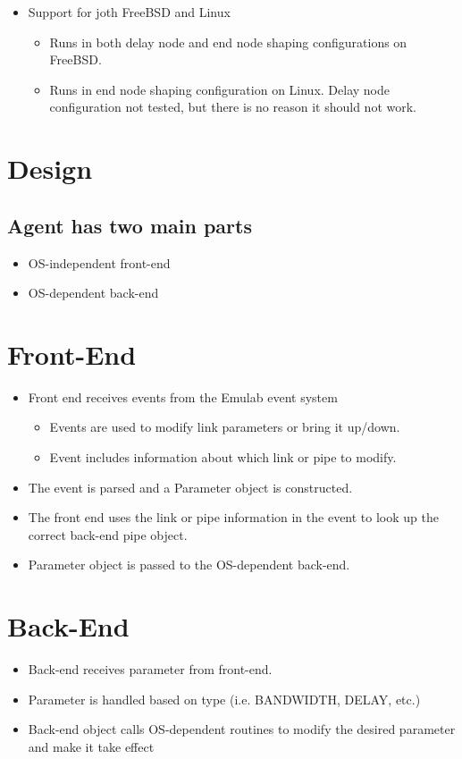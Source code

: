 \documentclass[12pt]{article}
\begin{document}
\begin{itemize}
\item
Support for joth FreeBSD and Linux
\begin{itemize}
\item
Runs in both delay node and end node shaping configurations on FreeBSD.
\item
Runs in end node shaping configuration on Linux.  Delay node configuration not tested, but there is no reason it should not work.
\end{itemize}
\end{itemize}

\section{Design}

\subsection{Agent has two main parts}
\begin{itemize}
\item
OS-independent front-end
\item
OS-dependent back-end
\end{itemize}

\section{Front-End}

\begin{itemize}
\item
Front end receives events from the Emulab event system
\begin{itemize}
\item
Events are used to modify link parameters or bring it up/down.

\item
Event includes information about which link or pipe to modify.

\end{itemize}
\item
The event is parsed and a Parameter object is constructed.
\item
The front end uses the link or pipe information in the event to look up the correct back-end pipe object.
\item
Parameter object is passed to the OS-dependent back-end.
\end{itemize}

\section{Back-End}

\begin{itemize}
\item
Back-end receives parameter from front-end.
\item
Parameter is handled based on type (i.e. BANDWIDTH, DELAY, etc.)
\item
Back-end object calls OS-dependent routines to modify the desired parameter and make it take effect
\end{itemize}
\end{document}

